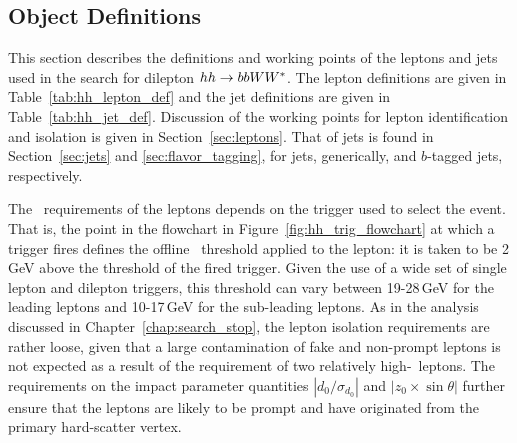 %
%
\subsection{Object Definitions}
\label{sec:hh_object_def}

This section describes the definitions and working points of the leptons and jets used
in the search for dilepton $hh \rightarrow bbWW^*$.
The lepton definitions are given in Table~\ref{tab:hh_lepton_def} and the jet definitions are
given in Table~\ref{tab:hh_jet_def}.
Discussion of the working points for lepton identification and isolation is given in
Section~\ref{sec:leptons}.
That of jets is found in Section~\ref{sec:jets} and \ref{sec:flavor_tagging}, for
jets, generically, and $b$-tagged jets, respectively.

The \pT~requirements of the leptons depends on the trigger used to select the event.
That is, the point in the flowchart in Figure~\ref{fig:hh_trig_flowchart} at which
a trigger fires defines the offline \pT~threshold applied to the lepton: it is taken
to be 2\,GeV above the threshold of the fired trigger.
Given the use of a wide set of single lepton and dilepton triggers, this threshold
can vary between 19-28\,GeV for the leading leptons and 10-17\,GeV for the sub-leading leptons.
As in the analysis discussed in Chapter~\ref{chap:search_stop},
the lepton isolation requirements are rather loose, given that a large contamination of
fake and non-prompt leptons is not expected as a result of the requirement of two relatively
high-\pT~leptons.
The requirements on the impact parameter quantities $|d_0 / \sigma_{d_0}|$ and $|z_0 \times \sin \theta|$
further ensure that the leptons are likely to be prompt and have originated
from the primary hard-scatter vertex.

